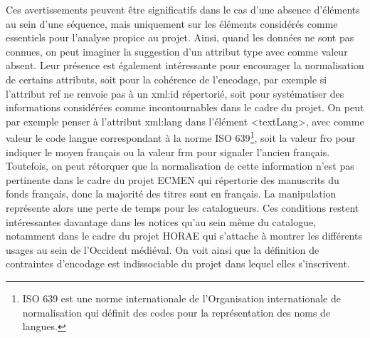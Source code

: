 \documentclass[a4paper,12pt,twoside]{book}
\begin{document}
	Ces avertissements peuvent être significatifs dans le cas d’une absence d’éléments au sein d’une séquence, mais uniquement sur les éléments considérés comme essentiels pour l’analyse propice au projet. Ainsi, quand les données ne sont pas connues, on peut imaginer la suggestion d'un attribut type avec comme valeur absent. Leur présence est également intéressante pour encourager la normalisation de certains attributs, soit pour la cohérence de l’encodage, par exemple si l’attribut ref ne renvoie pas à un xml:id répertorié, soit pour systématiser des informations considérées comme incontournables dans le cadre du projet. On peut par exemple penser à l’attribut xml:lang dans l’élément \textless textLang\textgreater, avec comme valeur le code langue correspondant à la norme ISO 639\footnote{ISO 639 est une norme internationale de l’Organisation internationale de normalisation qui définit des codes pour la représentation des noms de langues.}, soit la valeur \og fro\fg{} pour indiquer le moyen français ou la valeur \og frm\fg{} pour signaler l’ancien français. Toutefois, on peut rétorquer que la normalisation de cette information n’est pas pertinente dans le cadre du projet ECMEN qui répertorie des manuscrits du fonds français, donc la majorité des titres sont en français. La manipulation représente alors une perte de temps pour les catalogueurs. Ces conditions restent intéressantes davantage dans les notices qu’au sein même du catalogue, notamment dans le cadre du projet HORAE qui s'attache à montrer les différents usages au sein de l'Occident médiéval. On voit ainsi que la définition de contraintes d'encodage est indissociable du projet dans lequel elles s'inscrivent.
	
\end{document}
